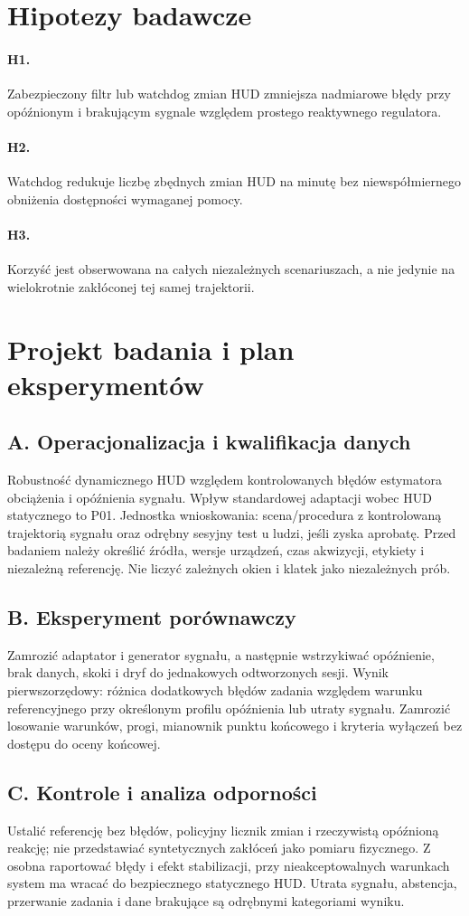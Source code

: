 \documentclass[11pt,a4paper]{article}
\begin{document}
\section{Hipotezy badawcze}
\paragraph{H1.} Zabezpieczony filtr lub watchdog zmian HUD zmniejsza nadmiarowe błędy przy opóźnionym i brakującym sygnale względem prostego reaktywnego regulatora.
\paragraph{H2.} Watchdog redukuje liczbę zbędnych zmian HUD na minutę bez niewspółmiernego obniżenia dostępności wymaganej pomocy.
\paragraph{H3.} Korzyść jest obserwowana na całych niezależnych scenariuszach, a nie jedynie na wielokrotnie zakłóconej tej samej trajektorii.
\section{Projekt badania i plan eksperymentów}
\subsection{A. Operacjonalizacja i kwalifikacja danych}
Robustność dynamicznego HUD względem kontrolowanych błędów estymatora obciążenia i opóźnienia sygnału. Wpływ standardowej adaptacji wobec HUD statycznego to P01. Jednostka wnioskowania: scena/procedura z kontrolowaną trajektorią sygnału oraz odrębny sesyjny test u ludzi, jeśli zyska aprobatę. Przed badaniem należy określić źródła, wersje urządzeń, czas akwizycji, etykiety i niezależną referencję. Nie liczyć zależnych okien i klatek jako niezależnych prób.
\subsection{B. Eksperyment porównawczy}
Zamrozić adaptator i generator sygnału, a następnie wstrzykiwać opóźnienie, brak danych, skoki i dryf do jednakowych odtworzonych sesji. Wynik pierwszorzędowy: różnica dodatkowych błędów zadania względem warunku referencyjnego przy określonym profilu opóźnienia lub utraty sygnału. Zamrozić losowanie warunków, progi, mianownik punktu końcowego i kryteria wyłączeń bez dostępu do oceny końcowej.
\subsection{C. Kontrole i analiza odporności}
Ustalić referencję bez błędów, policyjny licznik zmian i rzeczywistą opóźnioną reakcję; nie przedstawiać syntetycznych zakłóceń jako pomiaru fizycznego. Z osobna raportować błędy i efekt stabilizacji, przy nieakceptowalnych warunkach system ma wracać do bezpiecznego statycznego HUD. Utrata sygnału, abstencja, przerwanie zadania i dane brakujące są odrębnymi kategoriami wyniku.
\end{document}
